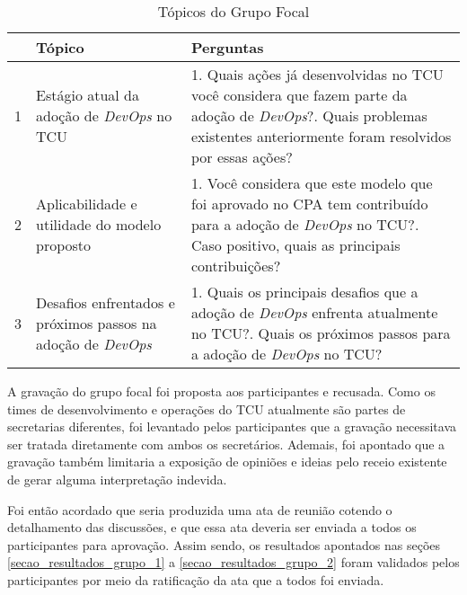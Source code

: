 \begin{table}[hb!]
\centering
\label{tabela_topicos}
\begin{tabular}{|p{0.3cm}|p{6.4cm}|p{7cm}|} \hline
& \textbf{Tópico} & \textbf{Perguntas} \\ \hline

1 & Estágio atual da adoção de {\it DevOps} no \acrshort{TCU} &
1. Quais ações já desenvolvidas no \acrshort{TCU} você considera que fazem parte da adoção de {\it DevOps}?\newline\newline
2. Quais problemas existentes anteriormente foram resolvidos por essas ações? \\ \hline

2 & Aplicabilidade e utilidade do modelo proposto &
1. Você considera que este modelo que foi aprovado no \acrshort{CPA} tem contribuído para a adoção de {\it DevOps} no \acrshort{TCU}?\newline\newline
2. Caso positivo, quais as principais contribuições? \\ \hline

3 & Desafios enfrentados e próximos passos na adoção de {\it DevOps} &
1. Quais os principais desafios que a adoção de {\it DevOps} enfrenta atualmente no \acrshort{TCU}?\newline\newline
2. Quais os próximos passos para a adoção de {\it DevOps} no \acrshort{TCU}?\\ \hline

\end{tabular}
\caption{Tópicos do Grupo Focal}
\end{table}

A gravação do grupo focal foi proposta aos participantes e recusada.
Como os times de desenvolvimento e operações do \acrshort{TCU} atualmente são
partes de secretarias diferentes, foi levantado pelos participantes que a
gravação necessitava ser tratada diretamente com ambos os secretários. Ademais,
foi apontado que a gravação também limitaria a exposição de opiniões e ideias
pelo receio existente de gerar alguma interpretação indevida.

Foi então acordado que seria produzida uma ata de reunião cotendo o detalhamento
das discussões, e que essa ata deveria ser enviada a todos os participantes para
aprovação. Assim sendo, os resultados apontados nas seções \ref{secao_resultados_grupo_1}
a \ref{secao_resultados_grupo_2}
foram validados pelos participantes por meio da ratificação da ata que a todos
foi enviada.

